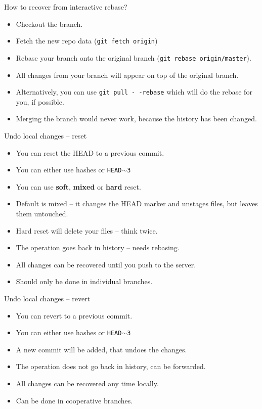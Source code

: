 \documentclass[14pt]{beamer}
\begin{document}
	\begin{frame}{How to recover from interactive rebase?}
	\begin{itemize}
		\item Checkout the branch.
		\item Fetch the new repo data (\texttt{git fetch origin})
		\item Rebase your branch onto the original branch (\texttt{git rebase origin/master}).
		\item All changes from your branch will appear on top of the original branch.
		\item Alternatively, you can use \texttt{git pull -\,-rebase} which will do the rebase for you, if possible.
		\item Merging the branch would never work, because the history has been changed.
	\end{itemize}
\end{frame}

\begin{frame}{Undo local changes -- reset}
	\begin{itemize}
		\item You can reset the HEAD to a previous commit.
		\item You can either use hashes or \texttt{HEAD$\sim$3}
		\item You can use \textbf{soft}, \textbf{mixed} or \textbf{hard} reset.
		\item Default is mixed -- it changes the HEAD marker and unstages files, but leaves them untouched.
		\item Hard reset will delete your files -- think twice.
		\item The operation goes back in history -- needs rebasing.
		\item All changes can be recovered until you push to the server.
		\item Should only be done in individual branches.
	\end{itemize}
\end{frame}

\begin{frame}{Undo local changes -- revert}
	\begin{itemize}
		\item You can revert to a previous commit.
		\item You can either use hashes or \texttt{HEAD$\sim$3}
		\item A new commit will be added, that undoes the changes.
		\item The operation does not go back in history, can be forwarded.
		\item All changes can be recovered any time locally.
		\item Can be done in cooperative branches.
	\end{itemize}
\end{frame}
\end{document}
